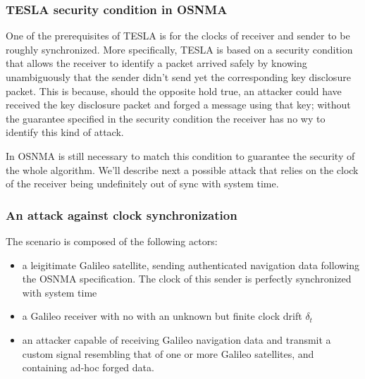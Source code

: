 \subsubsection{TESLA security condition in OSNMA}

One of the prerequisites of TESLA is for the clocks of receiver and sender to be
roughly synchronized. More specifically, TESLA is based on a security condition
that allows the receiver to identify a packet arrived safely by knowing
unambiguously that the sender didn't send yet the corresponding key disclosure
packet. This is because, should the opposite hold true, an attacker could have
received the key disclosure packet and forged a message using that key; without
the guarantee specified in the security condition the receiver has no wy to
identify this kind of attack.

In OSNMA is still necessary to match this condition to guarantee the security of
the whole algorithm. We'll describe next a possible attack that relies on the
clock of the receiver being undefinitely out of sync with system time.

\subsubsection{An attack against clock synchronization}
The scenario is composed of the following actors:
\begin{itemize}
  \item a leigitimate Galileo satellite, sending authenticated navigation data
    following the OSNMA specification. The clock of this sender is perfectly
    synchronized with system time
  \item a Galileo receiver with no with an unknown but finite clock drift
    $\delta_t$
  \item an attacker capable of receiving Galileo navigation data and transmit a
    custom signal resembling that of one or more Galileo satellites, and
    containing ad-hoc forged data.
\end{itemize}

